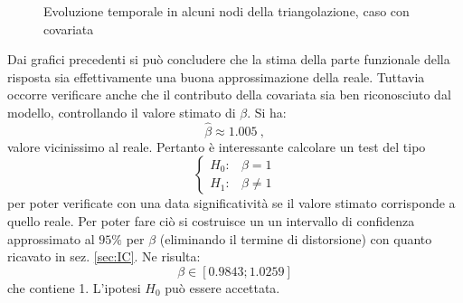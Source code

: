 \documentclass[a4paper,11pt,twoside,openright]{book}							%
\begin{document}
\begin{figure}[t]
	\centering
	\caption{Evoluzione temporale in alcuni nodi della triangolazione, caso con covariata}
	\label{fig:DomCcovar_ris2}
\end{figure}

Dai grafici precedenti si può concludere che la stima della parte funzionale della risposta sia effettivamente una buona approssimazione della reale. Tuttavia occorre verificare anche che il contributo della covariata sia ben riconosciuto dal modello, controllando il valore stimato di $\beta$. Si ha:
$$
\hat{\beta} \approx 1.005 \ ,
$$
valore vicinissimo al reale. Pertanto è interessante calcolare un test del tipo
$$
\begin{cases}
H_0: & \beta=1 \\
H_1: & \beta \not = 1
\end{cases}
$$
per poter verificate con una data significatività se il valore stimato corrisponde a quello reale. Per poter fare ciò si costruisce un un intervallo di confidenza approssimato al $95\%$ per $\beta$ (eliminando il termine di distorsione) con quanto ricavato in sez. \ref{sec:IC}. Ne risulta:
$$
\beta \in [0.9843;1.0259]
$$
che contiene 1. L'ipotesi $H_0$ può essere accettata.
\end{document}
